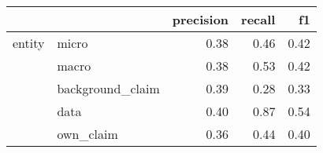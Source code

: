 \begin{tabular}{llrrr}
\toprule
       &           &  precision &  recall &   f1 \\
\midrule
entity & micro &       0.38 &    0.46 & 0.42 \\
       & macro &       0.38 &    0.53 & 0.42 \\
       & background\_claim &       0.39 &    0.28 & 0.33 \\
       & data &       0.40 &    0.87 & 0.54 \\
       & own\_claim &       0.36 &    0.44 & 0.40 \\
\bottomrule
\end{tabular}
